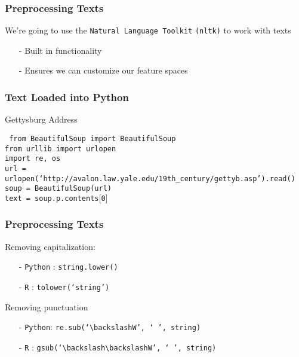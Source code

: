 \documentclass{beamer}
\numberwithin{equation}{section}
\begin{document}
\begin{frame}
\frametitle{Preprocessing Texts}

We're going to use the {\tt Natural Language Toolkit} {\tt (nltk)} to work with texts \\
\begin{itemize}
\item[-] Built in functionality
\item[-] Ensures we can customize our feature spaces
\end{itemize}

\end{frame}


\begin{frame}
\frametitle{Text Loaded into Python}

Gettysburg Address

\vspace{0.25in}
\begin{footnotesize}

{\tt
from BeautifulSoup import BeautifulSoup\\
from urllib import urlopen\\
import re, os\\

url  = urlopen(`http://avalon.law.yale.edu/19th\_century/gettyb.asp').read()\\


soup = BeautifulSoup(url)\\


text = soup.p.contents$[$0$]$\\

}

\end{footnotesize}

\end{frame}




\begin{frame}
\frametitle{Preprocessing Texts}

Removing capitalization: 
\begin{itemize}
\item[-] {\tt Python} : \alert{{\tt string.lower()}}
\item[-] {\tt R} : \alert{{\tt tolower(`string')}}
\end{itemize}
Removing punctuation
\begin{itemize}
\item[-] {\tt Python}: \alert{{\tt re.sub(`$\backslash$W', ` ', string)}}
\item[-] {\tt R} : \alert{{\tt gsub(`$\backslash\backslash$W', ` ', string)}}
\end{itemize}


\end{frame}
\end{document}
